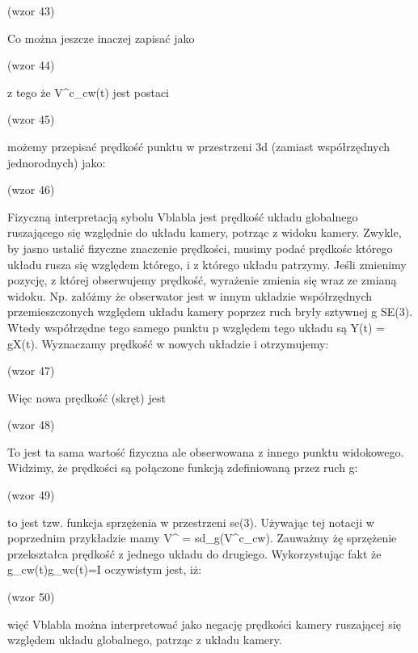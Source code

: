 (wzor 43)

Co można jeszcze inaczej zapisać jako

(wzor 44)

z tego że V^c_cw(t) jest postaci

(wzor 45)

możemy przepisać prędkość punktu w przestrzeni 3d (zamiast współrzędnych jednorodnych) jako:

(wzor 46) 

Fizyczną interpretacją sybolu Vblabla jest prędkość układu globalnego ruszającego się względnie do układu kamery, potrząc z widoku kamery. Zwykle, by jasno ustalić fizyczne znaczenie prędkości, musimy podać prędkośc którego układu rusza się względem którego, i z którego układu patrzymy. Jeśli zmienimy pozycję, z której obserwujemy prędkość, wyrażenie zmienia się wraz ze zmianą widoku. Np. załóżmy że obserwator jest w innym układzie współrzędnych przemieszczonych względem układu kamery poprzez ruch bryły sztywnej g \in SE(3). Wtedy współrzędne tego samego punktu p względem tego układu są Y(t) = gX(t). Wyznaczamy prędkość w nowych układzie i otrzymujemy:

(wzor 47)

Więc nowa prędkość (skręt) jest

(wzor 48)

To jest ta sama wartość fizyczna ale obserwowana z innego punktu widokowego. Widzimy, że prędkości są połączone funkcją zdefiniowaną przez ruch g:

(wzor 49)

to jest tzw. funkcja sprzężenia w przestrzeni se(3). Używając tej notacji w poprzednim przykładzie mamy V^ = sd_g(V^c_cw). Zauważmy żę sprzężenie przekształca prędkość z jednego układu do drugiego. Wykorzystując fakt że g_cw(t)g_wc(t)=I oczywistym jest, iż:

(wzor 50)

więć Vblabla można interpretować jako negację prędkości kamery ruszającej się względem układu globalnego, patrząc z układu kamery.

